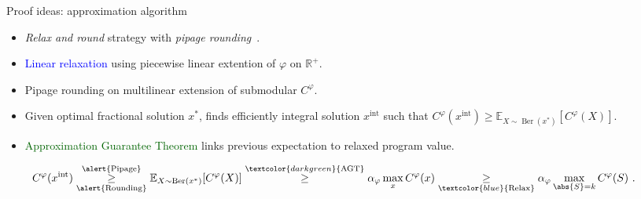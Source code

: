 \documentclass{beamer}
\theoremstyle{definition}
\theoremstyle{remark}
\DeclareMathOperator{\Ber}{\text{Ber}}
\begin{document}
\begin{frame}{Proof ideas: approximation algorithm}
  \begin{itemize}
  \item \emph{Relax and round} strategy with \emph{pipage rounding}~\cite{AS04, Vondrak07}.\pause
    \bigskip
  \item \textcolor{blue}{Linear relaxation} using piecewise linear extention of $\varphi$ on $\mathbb{R}^+$.
    \bigskip
  \item \alert{Pipage rounding} on multilinear extension of submodular $C^{\varphi}$.
  \item Given optimal fractional solution $x^*$, finds efficiently integral solution $x^{\text{int}}$ such that $C^{\varphi}(x^{\text{int}}) \geq \mathbb{E}_{X \sim \Ber(x^*)}[C^{\varphi}(X)]$.
    \bigskip

  \item \textcolor{darkgreen}{Approximation Guarantee Theorem} links previous expectation to relaxed program value.
  \end{itemize}

  \pause
  \begin{align*}
    \hspace*{-0.7cm} C^{\varphi}(x^{\text{int}}) \underset{\alert{\text{Rounding}}}{\overset{\alert{\text{Pipage}}}{\geq}} \mathbb{E}_{X \sim \Ber(x^*)}[C^{\varphi}(X)]  \overset{\textcolor{darkgreen}{\text{AGT}}}{\geq} \alpha_{\varphi} \max_x  C^{\varphi}(x) \underset{\textcolor{blue}{\text{Relax}}}{\geq} \alpha_{\varphi} \max_{\abs{S} = k} C^{\varphi}(S)\ .
  \end{align*}
\end{frame}
\end{document}
